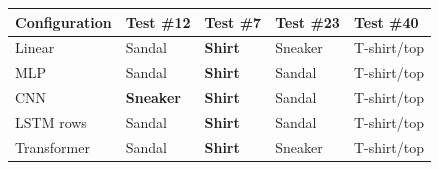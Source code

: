 \begin{tabularx}{\textwidth}{@{}lYYYY@{}}
\toprule
Configuration & Test \#12 & Test \#7 & Test \#23 & Test \#40 \\
\midrule
Linear & Sandal & \textbf{Shirt} & Sneaker & T-shirt/top \\
MLP & Sandal & \textbf{Shirt} & Sandal & T-shirt/top \\
CNN & \textbf{Sneaker} & \textbf{Shirt} & Sandal & T-shirt/top \\
LSTM rows & Sandal & \textbf{Shirt} & Sandal & T-shirt/top \\
Transformer & Sandal & \textbf{Shirt} & Sneaker & T-shirt/top \\
\bottomrule
\end{tabularx}
